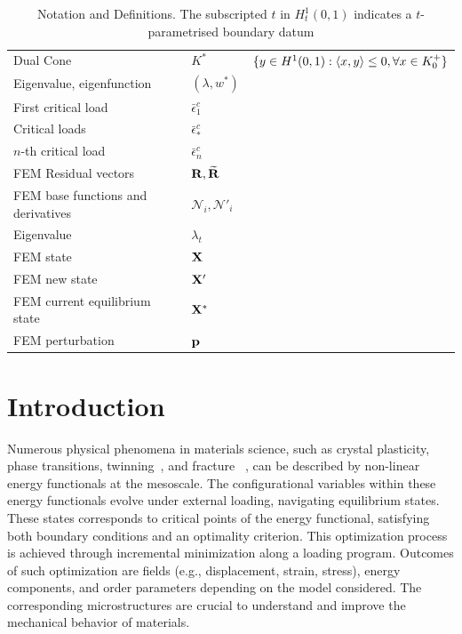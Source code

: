 \documentclass[10pt]{article}
\begin{document}
\begin{table}[h!]
\begin{tabular}{  m{5.5cm}  m{3cm}  m{6cm}  }
    Dual Cone& $K^*$ & $\{y \in H^1(0,1): \langle x,y \rangle \leq 0, \forall x \in K^+_{0}\}$\\
    Eigenvalue, eigenfunction& $(\lambda, w^*)$ & \\
    First critical load & $\bar \epsilon^c_1$ & \\
    Critical loads & $\bar \epsilon^c_*$ & \\
    $n$-th critical load & $\bar \epsilon^c_n$ & \\
    FEM Residual vectors& ${\bf R}, \widetilde{\bf R}$ & \\
    FEM base functions and derivatives  & ${\mathcal N}_i, {\mathcal N}'_i$ & \\
   Eigenvalue & $\lambda_t$ & \\
   FEM state & $\mathbf{X}$ & \\
   FEM new state & $\mathbf{X}'$ & \\
   FEM current equilibrium state & $\mathbf{X^*}$ & \\
   FEM perturbation & $\mathbf{p}$ & \\
  \end{tabular}
  \caption{Notation and Definitions. The subscripted $t$ in $H_t^1(0, 1)$ indicates a $t$-parametrised boundary datum}
\label{table:notation}
\end{table}

\section{Introduction}
Numerous physical phenomena in materials science, such as crystal plasticity, phase transitions, twinning~\cite{Clayton2011-xq}, and fracture ~\cite{francfort_marigo1998,Baldelli2014-ho,Baldelli2021-gc}, can be described by non-linear energy functionals at the mesoscale. 
%
The configurational variables within these energy functionals evolve under external loading, navigating equilibrium states. These states corresponds to critical points of the energy functional, satisfying both boundary conditions and an optimality criterion.
This optimization process is achieved through incremental minimization along a loading program. Outcomes of such optimization are fields
(e.g., displacement, strain, stress), energy components, and order parameters depending on the model considered. The corresponding microstructures are crucial to understand and improve the mechanical behavior of materials.
\end{document}
